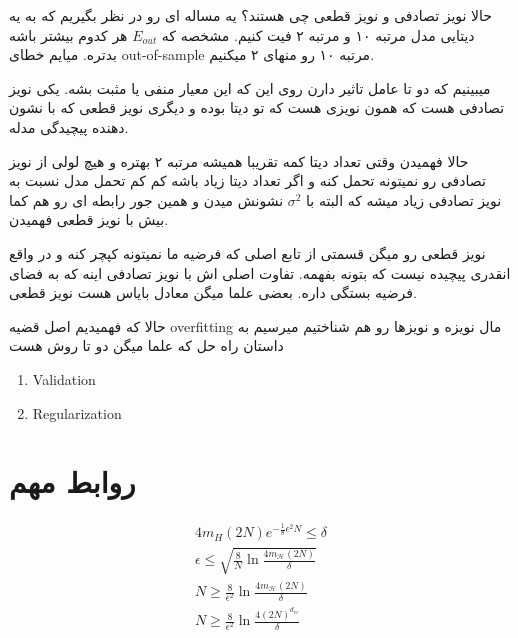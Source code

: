 \documentclass[twocolumn,11pt]{article}
\begin{document}
حالا نویز تصادفی و نویز قطعی چی هستند؟
یه مساله ای رو در نظر بگیریم که به یه دیتایی مدل مرتبه ۱۰ و مرتبه ۲ فیت کنیم. مشخصه که 
$E_{out}$
هر کدوم بیشتر باشه بدتره. میایم خطای out-of-sample 
مرتبه ۱۰ رو منهای ۲ میکنیم. 

میبینیم که دو تا عامل تاثیر دارن روی این که این معیار منفی یا مثبت بشه. یکی نویز تصادفی هست که همون نویزی هست که تو دیتا بوده و دیگری نویز قطعی که با نشون دهنده پیچیدگی مدله. 

حالا فهمیدن وقتی تعداد دیتا کمه تقریبا همیشه مرتبه ۲ بهتره و هیچ لولی از نویز تصادفی رو نمیتونه تحمل کنه و اگر تعداد دیتا زیاد باشه کم کم تحمل مدل نسبت به نویز تصادفی زیاد میشه که البته با 
$\sigma^2$ 
نشونش میدن و همین جور رابطه ای رو هم کما بیش با نویز قطعی فهمیدن. 

نویز قطعی رو میگن قسمتی از تابع اصلی که فرضیه ما نمیتونه کپچر کنه و در واقع انقدری پیچیده نیست که بتونه بفهمه. 
تفاوت اصلی اش با نویز تصادفی اینه که به فضای فرضیه بستگی داره. بعضی علما میگن معادل بایاس هست نویز قطعی. 

حالا که فهمیدیم اصل قضیه overfitting 
مال نویزه و نویزها رو هم شناختیم میرسیم به داستان راه حل که علما میگن دو تا روش هست

\begin{enumerate}
\item Validation
\item Regularization
\end{enumerate}

\section{روابط مهم}
\begin{gather}
4 m_H(2N) e^{-\frac{1}{8}\epsilon^2 N} \leq \delta \\
\epsilon \leq \sqrt{\frac{8}{N}\ln{\frac{4m_{\mathcal{H}}(2N)}{\delta}}}
\\
N \geq \frac{8}{\epsilon^2}\ln{\frac{4m_{\mathcal{H}}(2N)}{\delta}}
\\
N \geq \frac{8}{\epsilon^2}\ln{\frac{4(2N)^{d_{vc}}}{\delta}}
\end{gather}
\end{document}
